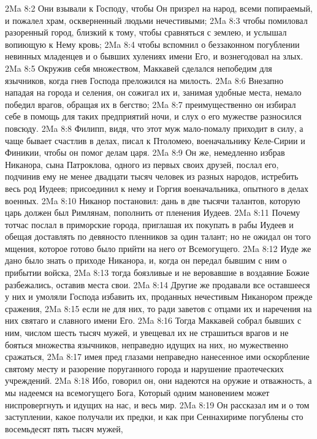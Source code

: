\vs 2Ma 8:2 Они взывали к Господу, чтобы Он призрел на народ, всеми попираемый, и пожалел храм, оскверненный людьми нечестивыми;
\vs 2Ma 8:3 чтобы помиловал разоренный город, близкий к тому, чтобы сравняться с землею, и услышал вопиющую к Нему кровь;
\vs 2Ma 8:4 чтобы вспомнил о беззаконном погублении невинных младенцев и о бывших хулениях имени Его, и вознегодовал на злых.
\vs 2Ma 8:5 Окружив себя множеством, Маккавей сделался непобедим для язычников, когда гнев Господа преложился на милость.
\vs 2Ma 8:6 Внезапно нападая на города и селения, он сожигал их и, занимая удобные места, немало победил врагов, обращая их в бегство;
\vs 2Ma 8:7 преимущественно он избирал себе в помощь для таких предприятий ночи, и слух о его мужестве разносился повсюду.
\rsbpar\vs 2Ma 8:8 Филипп, видя, что этот муж мало-помалу приходит в силу, а чаще бывает счастлив в делах, писал к Птоломею, военачальнику Келе-Сирии и Финикии, чтобы он помог делам царя.
\vs 2Ma 8:9 Он же, немедленно избрав Никанора, сына Патроклова, одного из первых своих друзей, послал его, подчинив ему не менее двадцати тысяч человек из разных народов, истребить весь род Иудеев; присоединил к нему и Горгия военачальника, опытного в делах военных.
\vs 2Ma 8:10 Никанор постановил: дань в две тысячи талантов, которую царь должен был Римлянам, пополнить от пленения Иудеев.
\vs 2Ma 8:11 Почему тотчас послал в приморские города, приглашая их покупать в рабы Иудеев и обещая доставлять по девяносто пленников за один талант; но не ожидал он того мщения, которое готово было прийти на него от Всемогущего.
\vs 2Ma 8:12 Иуде же дано было знать о приходе Никанора, и, когда он передал бывшим с ним о прибытии войска,
\vs 2Ma 8:13 тогда боязливые и не веровавшие в воздаяние Божие разбежались, оставив места свои.
\vs 2Ma 8:14 Другие же продавали все оставшееся у них и умоляли Господа избавить их, проданных нечестивым Никанором прежде сражения,
\vs 2Ma 8:15 если не для них, то ради заветов с отцами их и наречения на них святаго и славного имени Его.
\rsbpar\vs 2Ma 8:16 Тогда Маккавей собрал бывших с ним, числом шесть тысяч мужей, и увещевал их не страшиться врагов и не бояться множества язычников, неправедно идущих на них, но мужественно сражаться,
\vs 2Ma 8:17 имея пред глазами неправедно нанесенное ими оскорбление святому месту и разорение поруганного города и нарушение праотеческих учреждений.
\vs 2Ma 8:18 Ибо, говорил он, они надеются на оружие и отважность, а мы надеемся на всемогущего Бога, Который одним мановением может ниспровергнуть и идущих на нас, и весь мир.
\vs 2Ma 8:19 Он рассказал им и о том заступлении, какое получали их предки, и как при Сеннахириме погублены сто восемьдесят пять тысяч мужей,
